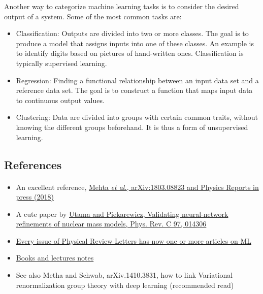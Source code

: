 \documentclass[%
oneside,                 %
final,                   %
10pt]{article}
\begin{document}
Another way to categorize machine learning tasks is to consider the desired output of a system.
Some of the most common tasks are:

\begin{itemize}
  \item Classification: Outputs are divided into two or more classes. The goal is to   produce a model that assigns inputs into one of these classes. An example is to identify  digits based on pictures of hand-written ones. Classification is typically supervised learning.

  \item Regression: Finding a functional relationship between an input data set and a reference data set.   The goal is to construct a function that maps input data to continuous output values.

  \item Clustering: Data are divided into groups with certain common traits, without knowing the different groups beforehand.  It is thus a form of unsupervised learning.
\end{itemize}

\noindent




\subsection{References}

\paragraph{}
\begin{itemize}
\item An excellent reference, \href{{https://arxiv.org/abs/1803.08823}}{Mehta \emph{et al.}, arXiv:1803.08823 and Physics Reports in press (2018)}

\item A cute paper by \href{{https://journals.aps.org/prc/abstract/10.1103/PhysRevC.97.014306}}{Utama and Piekarewicz, Validating neural-network refinements of nuclear mass models, Phys. Rev. C 97, 014306}

\item \href{{https://journals.aps.org/prl/abstract/10.1103/PhysRevLett.120.156001}}{Every issue of Physical Review Letters has now one or more articles on ML}

\item \href{{https://github.com/CompPhysics/MachineLearning}}{Books and lectures notes}

\item See also Metha and Schwab, arXiv.1410.3831, how to link Variational renormalization group theory with deep learning (recommended read)
\end{itemize}
\end{document}
